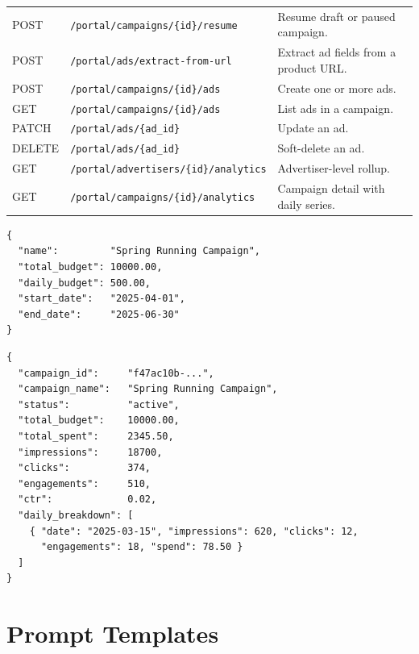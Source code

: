 \begin{appendices}
\begin{table}[H]
\begin{tabular}{@{}llp{7cm}@{}}
        POST    & \texttt{/portal/campaigns/\{id\}/resume}                & Resume draft or paused campaign.     \\
        POST    & \texttt{/portal/ads/extract-from-url}                   & Extract ad fields from a product URL.\\
        POST    & \texttt{/portal/campaigns/\{id\}/ads}                   & Create one or more ads.              \\
        GET     & \texttt{/portal/campaigns/\{id\}/ads}                   & List ads in a campaign.              \\
        PATCH   & \texttt{/portal/ads/\{ad\_id\}}                         & Update an ad.                        \\
        DELETE  & \texttt{/portal/ads/\{ad\_id\}}                         & Soft-delete an ad.                   \\
        GET     & \texttt{/portal/advertisers/\{id\}/analytics}           & Advertiser-level rollup.             \\
        GET     & \texttt{/portal/campaigns/\{id\}/analytics}             & Campaign detail with daily series.   \\
        \bottomrule
    \end{tabular}
\end{table}

\begin{lstlisting}[style=jsonstyle, caption={Campaign creation payload.}]
{
  "name":         "Spring Running Campaign",
  "total_budget": 10000.00,
  "daily_budget": 500.00,
  "start_date":   "2025-04-01",
  "end_date":     "2025-06-30"
}
\end{lstlisting}

\begin{lstlisting}[style=jsonstyle, caption={Campaign analytics response.}]
{
  "campaign_id":     "f47ac10b-...",
  "campaign_name":   "Spring Running Campaign",
  "status":          "active",
  "total_budget":    10000.00,
  "total_spent":     2345.50,
  "impressions":     18700,
  "clicks":          374,
  "engagements":     510,
  "ctr":             0.02,
  "daily_breakdown": [
    { "date": "2025-03-15", "impressions": 620, "clicks": 12,
      "engagements": 18, "spend": 78.50 }
  ]
}
\end{lstlisting}


\section{Prompt Templates}
\label{app:prompts}


\end{appendices}
